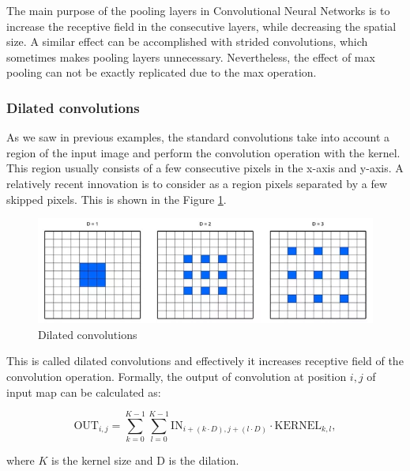The main purpose of the pooling layers in Convolutional Neural Networks is to increase the receptive field in the consecutive layers, while decreasing the spatial size.
A similar effect can be accomplished with strided convolutions, which sometimes makes pooling layers unnecessary.
Nevertheless, the effect of max pooling can not be exactly replicated due to the max operation.

\subsubsection{Dilated convolutions\cite{yu2015multi}}
As we saw in previous examples, the standard convolutions take into account a region of the input image and perform the convolution operation with the kernel.
This region usually consists of a few consecutive pixels in the x-axis and y-axis.
A relatively recent innovation is to consider as a region pixels separated by a few skipped pixels.
This is shown in the Figure \ref{fig:dilated_conv}.

\begin{figure}
    \centering
    \includegraphics[width=\linewidth]{imgs_andy/dilated_conv.png}
    \caption{Dilated convolutions}
    \label{fig:dilated_conv}
\end{figure}

This is called dilated convolutions and effectively it increases receptive field of the convolution operation.
Formally, the output of convolution at position $i, j$ of input map can be calculated as:

\begin{equation}
    \text{OUT}_{i,j} = \sum_{k=0}^{K-1} \sum_{l=0}^{K-1} \text{IN}_{i+(k \cdot D),j+(l \cdot D)} \cdot \text{KERNEL}_{k, l},
\end{equation}

where $K$ is the kernel size and D is the dilation.


